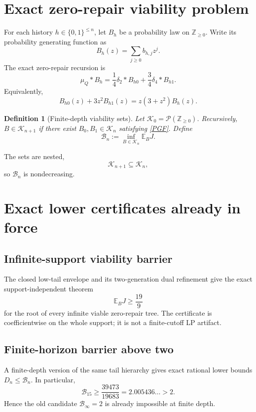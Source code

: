 \documentclass[11pt,a4paper]{article}
\newtheorem{definition}[theorem]{Definition}
\newcommand{\E}{\mathbb E}
\newcommand{\cB}{\mathcal B}
\newcommand{\cK}{\mathcal K}
\newcommand{\Z}{\mathbb Z}
\newcommand{\bits}{\{0,1\}}
\newcommand{\1}{\mathbf 1}
\begin{document}
\tableofcontents

\section{Exact zero-repair viability problem}

For each history \(h\in\bits^{\le n}\), let \(B_h\) be a probability law on
\(\Z_{\ge0}\).  Write its probability generating function as
\[
B_h(z)=\sum_{j\ge0}b_{h,j}z^j.
\]
The exact zero-repair recursion is
\[
\boxed{
\mu_Q*B_h
=
\frac14\delta_2*B_{h0}
+
\frac34\delta_4*B_{h1}.
}
\tag{ZR}
\]
Equivalently,
\[
\boxed{
B_{h0}(z)+3z^2B_{h1}(z)
=
z(3+z^2)B_h(z).
}
\tag{PGF}
\]

\begin{definition}[Finite-depth viability sets]
Let \(\cK_0=\mathcal P(\Z_{\ge0})\).  Recursively, \(B\in\cK_{n+1}\) if
there exist \(B_0,B_1\in\cK_n\) satisfying \eqref{PGF}.  Define
\[
\boxed{
\cB_n:=\inf_{B\in\cK_n}\E_BJ.
}
\]
\end{definition}

The sets are nested,
\[
\cK_{n+1}\subseteq\cK_n,
\]
so \(\cB_n\) is nondecreasing.

\section{Exact lower certificates already in force}

\subsection{Infinite-support viability barrier}

The closed low-tail envelope and its two-generation dual refinement give the
exact support-independent theorem
\[
\boxed{
\E_BJ\ge\frac{19}{9}
}
\]
for the root of every infinite viable zero-repair tree.
The certificate is coefficientwise on the whole support; it is not a
finite-cutoff LP artifact.

\subsection{Finite-horizon barrier above two}

A finite-depth version of the same tail hierarchy gives exact rational lower
bounds \(D_n\le\cB_n\).  In particular,
\[
\boxed{
\cB_{15}
\ge
\frac{39473}{19683}
=
2.005436\ldots
>2.
}
\]
Hence the old candidate \(\cB_\infty=2\) is already impossible at finite depth.
\end{document}
